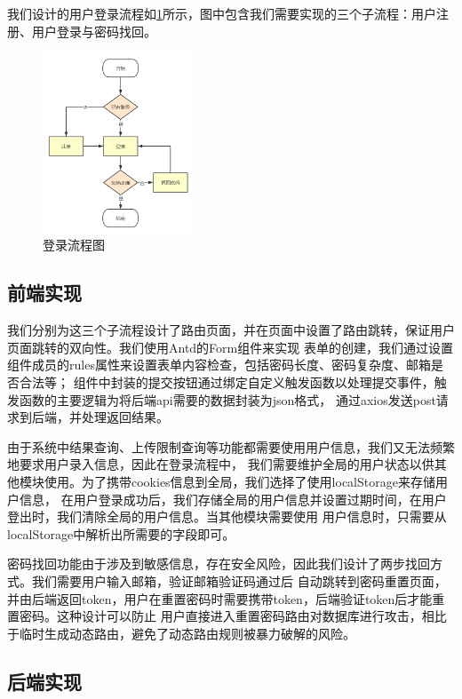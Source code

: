 我们设计的用户登录流程如\ref{fig:login-process}所示，图中包含我们需要实现的三个子流程：用户注册、用户登录与密码找回。
\begin{figure}[ht]
    \centering
    \includegraphics[width=0.4\textwidth]{source/img/login_process.png}
    \caption{登录流程图}
    \label{fig:login-process}
\end{figure}

\subsection{前端实现}

我们分别为这三个子流程设计了路由页面，并在页面中设置了路由跳转，保证用户页面跳转的双向性。我们使用Antd的Form组件来实现
表单的创建，我们通过设置组件成员的rules属性来设置表单内容检查，包括密码长度、密码复杂度、邮箱是否合法等；
组件中封装的提交按钮通过绑定自定义触发函数以处理提交事件，触发函数的主要逻辑为将后端api需要的数据封装为json格式，
通过axios发送post请求到后端，并处理返回结果。

由于系统中结果查询、上传限制查询等功能都需要使用用户信息，我们又无法频繁地要求用户录入信息，因此在登录流程中，
我们需要维护全局的用户状态以供其他模块使用。为了携带cookies信息到全局，我们选择了使用localStorage来存储用户信息，
在用户登录成功后，我们存储全局的用户信息并设置过期时间，在用户登出时，我们清除全局的用户信息。当其他模块需要使用
用户信息时，只需要从localStorage中解析出所需要的字段即可。

密码找回功能由于涉及到敏感信息，存在安全风险，因此我们设计了两步找回方式。我们需要用户输入邮箱，验证邮箱验证码通过后
自动跳转到密码重置页面，并由后端返回token，用户在重置密码时需要携带token，后端验证token后才能重置密码。这种设计可以防止
用户直接进入重置密码路由对数据库进行攻击，相比于临时生成动态路由，避免了动态路由规则被暴力破解的风险。

\subsection{后端实现}

